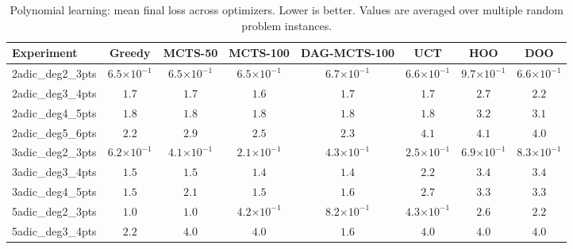 %
%


\begin{table}[ht]
\centering
\caption{Polynomial learning: mean final loss across optimizers. Lower is better. Values are averaged over multiple random problem instances.}
\label{tab:poly-learning-summary}
\begin{tabular}{lccccccc}
\toprule
Experiment & Greedy & MCTS-50 & MCTS-100 & DAG-MCTS-100 & UCT & HOO & DOO \\
\midrule
2adic\_deg2\_3pts & \textbf{$6.5{\scriptstyle\times 10^{-1}}$} & $6.5{\scriptstyle\times 10^{-1}}$ & $6.5{\scriptstyle\times 10^{-1}}$ & $6.7{\scriptstyle\times 10^{-1}}$ & $6.6{\scriptstyle\times 10^{-1}}$ & $9.7{\scriptstyle\times 10^{-1}}$ & $6.6{\scriptstyle\times 10^{-1}}$ \\
2adic\_deg3\_4pts & $1.7$ & $1.7$ & \textbf{$1.6$} & $1.7$ & $1.7$ & $2.7$ & $2.2$ \\
2adic\_deg4\_5pts & $1.8$ & $1.8$ & $1.8$ & $1.8$ & \textbf{$1.8$} & $3.2$ & $3.1$ \\
2adic\_deg5\_6pts & \textbf{$2.2$} & $2.9$ & $2.5$ & $2.3$ & $4.1$ & $4.1$ & $4.0$ \\
3adic\_deg2\_3pts & $6.2{\scriptstyle\times 10^{-1}}$ & $4.1{\scriptstyle\times 10^{-1}}$ & \textbf{$2.1{\scriptstyle\times 10^{-1}}$} & $4.3{\scriptstyle\times 10^{-1}}$ & $2.5{\scriptstyle\times 10^{-1}}$ & $6.9{\scriptstyle\times 10^{-1}}$ & $8.3{\scriptstyle\times 10^{-1}}$ \\
3adic\_deg3\_4pts & $1.5$ & $1.5$ & \textbf{$1.4$} & $1.4$ & $2.2$ & $3.4$ & $3.4$ \\
3adic\_deg4\_5pts & $1.5$ & $2.1$ & \textbf{$1.5$} & $1.6$ & $2.7$ & $3.3$ & $3.3$ \\
5adic\_deg2\_3pts & $1.0$ & $1.0$ & \textbf{$4.2{\scriptstyle\times 10^{-1}}$} & $8.2{\scriptstyle\times 10^{-1}}$ & $4.3{\scriptstyle\times 10^{-1}}$ & $2.6$ & $2.2$ \\
5adic\_deg3\_4pts & $2.2$ & $4.0$ & $4.0$ & \textbf{$1.6$} & $4.0$ & $4.0$ & $4.0$ \\
\bottomrule
\end{tabular}
\end{table}

